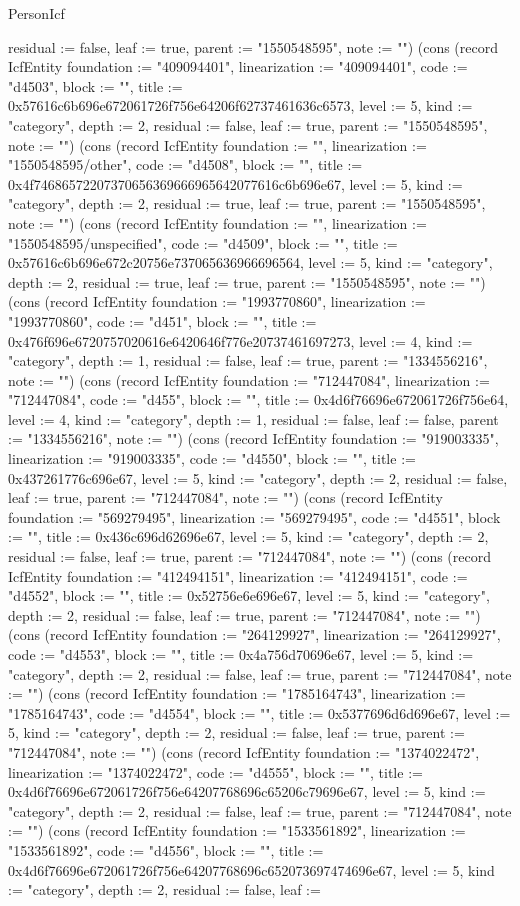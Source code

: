 \begin{lexlean}{PersonIcf}
\begin{semanticmodule}
{residual := false, leaf := true, parent := "1550548595", note := ""}) (cons (record IcfEntity {foundation := "409094401", linearization := "409094401", code := "d4503", block := "", title := 0x57616c6b696e672061726f756e64206f62737461636c6573, level := 5, kind := "category", depth := 2, residual := false, leaf := true, parent := "1550548595", note := ""}) (cons (record IcfEntity {foundation := "", linearization := "1550548595/other", code := "d4508", block := "", title := 0x4f74686572207370656369666965642077616c6b696e67, level := 5, kind := "category", depth := 2, residual := true, leaf := true, parent := "1550548595", note := ""}) (cons (record IcfEntity {foundation := "", linearization := "1550548595/unspecified", code := "d4509", block := "", title := 0x57616c6b696e672c20756e737065636966696564, level := 5, kind := "category", depth := 2, residual := true, leaf := true, parent := "1550548595", note := ""}) (cons (record IcfEntity {foundation := "1993770860", linearization := "1993770860", code := "d451", block := "", title := 0x476f696e6720757020616e6420646f776e20737461697273, level := 4, kind := "category", depth := 1, residual := false, leaf := true, parent := "1334556216", note := ""}) (cons (record IcfEntity {foundation := "712447084", linearization := "712447084", code := "d455", block := "", title := 0x4d6f76696e672061726f756e64, level := 4, kind := "category", depth := 1, residual := false, leaf := false, parent := "1334556216", note := ""}) (cons (record IcfEntity {foundation := "919003335", linearization := "919003335", code := "d4550", block := "", title := 0x437261776c696e67, level := 5, kind := "category", depth := 2, residual := false, leaf := true, parent := "712447084", note := ""}) (cons (record IcfEntity {foundation := "569279495", linearization := "569279495", code := "d4551", block := "", title := 0x436c696d62696e67, level := 5, kind := "category", depth := 2, residual := false, leaf := true, parent := "712447084", note := ""}) (cons (record IcfEntity {foundation := "412494151", linearization := "412494151", code := "d4552", block := "", title := 0x52756e6e696e67, level := 5, kind := "category", depth := 2, residual := false, leaf := true, parent := "712447084", note := ""}) (cons (record IcfEntity {foundation := "264129927", linearization := "264129927", code := "d4553", block := "", title := 0x4a756d70696e67, level := 5, kind := "category", depth := 2, residual := false, leaf := true, parent := "712447084", note := ""}) (cons (record IcfEntity {foundation := "1785164743", linearization := "1785164743", code := "d4554", block := "", title := 0x5377696d6d696e67, level := 5, kind := "category", depth := 2, residual := false, leaf := true, parent := "712447084", note := ""}) (cons (record IcfEntity {foundation := "1374022472", linearization := "1374022472", code := "d4555", block := "", title := 0x4d6f76696e672061726f756e64207768696c65206c79696e67, level := 5, kind := "category", depth := 2, residual := false, leaf := true, parent := "712447084", note := ""}) (cons (record IcfEntity {foundation := "1533561892", linearization := "1533561892", code := "d4556", block := "", title := 0x4d6f76696e672061726f756e64207768696c652073697474696e67, level := 5, kind := "category", depth := 2, residual := false, leaf := }
\end{semanticmodule}
\end{lexlean}
